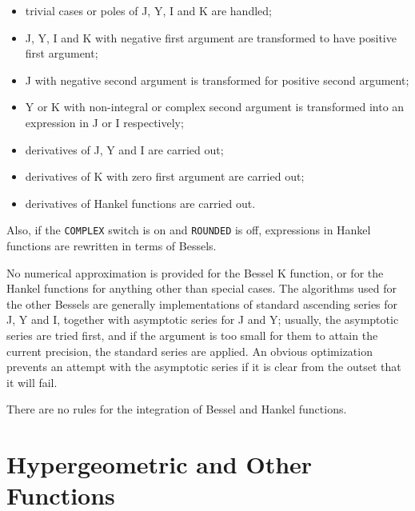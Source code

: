 \begin{itemize}
\item trivial cases or poles of J, Y, I and K are handled;
\item J, Y, I and K with negative first argument are transformed to have
positive first argument;
\item J with negative second argument is transformed for positive second
argument;
\item Y or K with non-integral or complex second argument is transformed
into an expression in J or I respectively;
\item derivatives of J, Y and I are carried out;
\item derivatives of K with zero first argument are carried out;
\item derivatives of Hankel functions are carried out.
\end{itemize}
Also, if the {\tt COMPLEX} switch is on and {\tt ROUNDED} is off,
expressions in Hankel functions are rewritten in terms of Bessels.

No numerical approximation is provided for the Bessel K function, or for
the Hankel functions for anything other than special cases.  The
algorithms used for the other Bessels are generally implementations of
standard ascending series for J, Y and I, together with asymptotic
series for J and Y; usually, the asymptotic series are tried first, and
if the argument is too small for them to attain the current precision,
the standard series are applied.  An obvious optimization prevents an
attempt with the asymptotic series if it is clear from the outset that
it will fail.

There are no rules for the integration of Bessel and Hankel functions.


\section{Hypergeometric and Other Functions}

